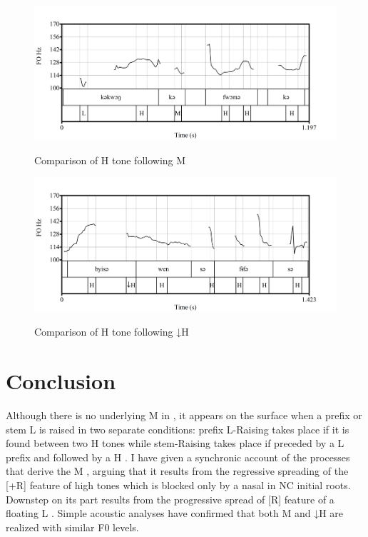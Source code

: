 \documentclass[output=paper,modfonts,nonflat,
colorlinks, citecolor=brown,
draftmode
]{langsci/langscibook}
\begin{document}
\begin{figure}[htbp]
	{\includegraphics[width=\textwidth]{figures/fig-akumbu-3a}}\\
    \caption{Comparison of H tone following M} \label{fig:akumbu:3}
\end{figure}
\begin{figure}[htbp]
	{\includegraphics[width=\textwidth]{figures/fig-akumbu-3b}}
    \caption{Comparison of H tone following ↓H} \label{fig:akumbu:4}
\end{figure}


\section{Conclusion}\label{sec:akumbu:6}

Although there is no underlying M  in , it appears on the surface when a prefix or stem L  is raised in two separate conditions: prefix L-Raising takes place if it is found between two H tones while stem-Raising takes place if preceded by a L prefix and followed by a H . I have given a synchronic account of the processes that derive the M , arguing that it results from the regressive spreading of the [+R] feature of high tones which is blocked only by a nasal in NC initial roots. Downstep on its part results from the progressive spread of [\textminus R] feature of a floating L . Simple acoustic analyses have confirmed that both M and ↓H are realized with similar F0 levels.
	
\end{document}
